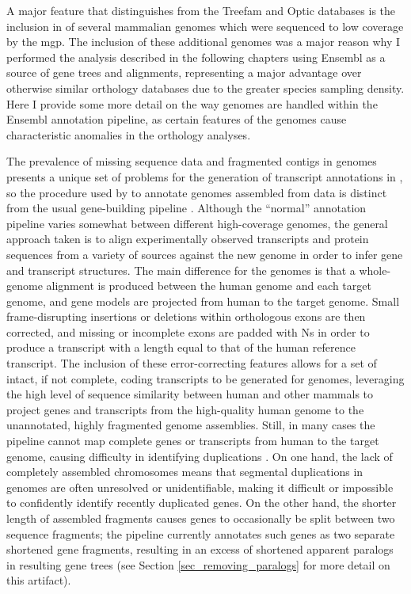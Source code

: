 A major feature that distinguishes \cmp from the Treefam and Optic
databases is the inclusion in \cmp of several mammalian genomes which
were sequenced to low coverage by the \ac{mgp}. The inclusion of these
additional genomes was a major reason why I performed the analysis
described in the following chapters using Ensembl as a source of gene
trees and alignments, representing a major advantage over otherwise
similar orthology databases due to the greater species sampling
density. Here I provide some more detail on the way \lcv genomes are
handled within the Ensembl annotation pipeline, as certain features of
the \lcv genomes cause characteristic anomalies in the orthology
analyses.

The prevalence of missing sequence data and fragmented contigs in \lcv
genomes presents a unique set of problems for the generation of
transcript annotations in \ens, so the procedure used by \cmp to
annotate genomes assembled from \lcv data is distinct from the usual
gene-building pipeline \citep{Hubbard2007}. Although the ``normal''
annotation pipeline varies somewhat between different high-coverage
genomes, the general approach taken is to align experimentally
observed transcripts and protein sequences from a variety of sources
against the new genome in order to infer gene and transcript
structures. The main difference for the \lcv genomes is that a
whole-genome alignment is produced between the human genome and each
\lcv target genome, and gene models are projected from human to the
target genome. Small frame-disrupting insertions or deletions within
orthologous exons are then corrected, and missing or incomplete exons
are padded with Ns in order to produce a transcript with a length
equal to that of the human reference transcript. The inclusion of
these error-correcting features allows for a set of intact, if not
complete, coding transcripts to be generated for \lcv genomes,
leveraging the high level of sequence similarity between human and
other \euth mammals to project genes and transcripts from the
high-quality human genome to the unannotated, highly fragmented \lcv
genome assemblies. Still, in many cases the \ens pipeline cannot map
complete genes or transcripts from human to the target genome, causing
difficulty in identifying duplications \citep{Hubbard2007}. On one
hand, the lack of completely assembled chromosomes means that
segmental duplications in \lcv genomes are often unresolved or
unidentifiable, making it difficult or impossible to confidently
identify recently duplicated genes. On the other hand, the shorter
length of assembled fragments causes genes to occasionally be split
between two sequence fragments; the \ens pipeline currently annotates
such genes as two separate shortened gene fragments, resulting in an
excess of shortened apparent paralogs in resulting gene trees (see
Section \ref{sec_removing_paralogs} for more detail on this artifact).

